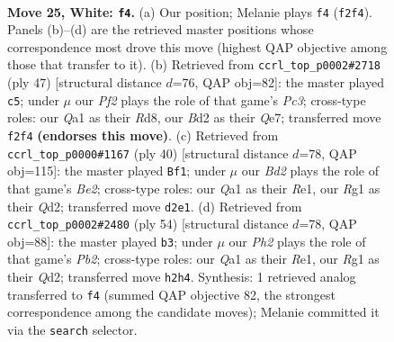 \documentclass[11pt]{article}
\begin{document}
\clearpage

\begin{figure}[p]\centering
\begin{subfigure}{0.46\textwidth}\centering
\resizebox{\linewidth}{!}{%
\newchessgame
\chessboard[
  setfen={r2rn1k1/p1p2p2/6p1/2Ppqb1p/3N4/1P2P1P1/3BRP1P/Q2K1BR1 w - - 0 25},
  showmover=false,
  pgfstyle=straightmove, color=movearrow, markmove={f2-f4}
]}
\caption{}
\end{subfigure}\hfill
\begin{subfigure}{0.46\textwidth}\centering
\resizebox{\linewidth}{!}{%
\newchessgame
\chessboard[
  setfen={1r1r2k1/p3qp2/1np1p1pp/Q2b4/5P2/2NBR1P1/PPPR3P/2K5 b - - 1 24},
  showmover=false,
  pgfstyle=straightmove, color=movearrow, markmove={c6-c5}
]}
\caption{}
\end{subfigure}
\\[4pt]
\begin{subfigure}{0.46\textwidth}\centering
\resizebox{\linewidth}{!}{%
\newchessgame
\chessboard[
  setfen={r3r1k1/1p1npp1p/p2pb1p1/8/1qP1P3/1PN4P/P2QBPP1/1R2R1K1 w - - 2 21},
  showmover=false,
  pgfstyle=straightmove, color=movearrow, markmove={e2-f1}
]}
\caption{}
\end{subfigure}\hfill
\begin{subfigure}{0.46\textwidth}\centering
\resizebox{\linewidth}{!}{%
\newchessgame
\chessboard[
  setfen={4r1k1/1p2rpp1/6bp/p1qpn3/P2N3P/2P2PP1/1P1QR1B1/4R1K1 w - - 1 28},
  showmover=false,
  pgfstyle=straightmove, color=movearrow, markmove={b2-b3}
]}
\caption{}
\end{subfigure}
\caption{\textbf{Move 25, White: \texttt{f4}.} (a) Our position; Melanie plays \texttt{f4} (\texttt{f2f4}). Panels (b)--(d) are the retrieved master positions whose correspondence most drove this move (highest QAP objective among those that transfer to it). (b) Retrieved from \texttt{ccrl\_top\_p0002\#2718} (ply 47) [structural distance $d$=76, QAP obj=82]: the master played \texttt{c5}; under $\mu$ our \emph{Pf2} plays the role of that game's \emph{Pc3}; cross-type roles: our \emph{Q}a1 as their \emph{R}d8, our \emph{B}d2 as their \emph{Q}e7; transferred move \texttt{f2f4} \textbf{(endorses this move)}. (c) Retrieved from \texttt{ccrl\_top\_p0000\#1167} (ply 40) [structural distance $d$=78, QAP obj=115]: the master played \texttt{Bf1}; under $\mu$ our \emph{Bd2} plays the role of that game's \emph{Be2}; cross-type roles: our \emph{Q}a1 as their \emph{R}e1, our \emph{R}g1 as their \emph{Q}d2; transferred move \texttt{d2e1}. (d) Retrieved from \texttt{ccrl\_top\_p0002\#2480} (ply 54) [structural distance $d$=78, QAP obj=88]: the master played \texttt{b3}; under $\mu$ our \emph{Ph2} plays the role of that game's \emph{Pb2}; cross-type roles: our \emph{Q}a1 as their \emph{R}e1, our \emph{R}g1 as their \emph{Q}d2; transferred move \texttt{h2h4}. Synthesis: 1 retrieved analog transferred to \texttt{f4} (summed QAP objective 82, the strongest correspondence among the candidate moves); Melanie committed it via the \texttt{search} selector.}
\label{fig:thought-m48}
\end{figure}
\end{document}
